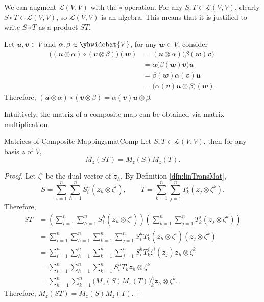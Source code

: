 \documentclass[math, code]{amznotes}
\theoremstyle{remark}
\begin{document}
We can augment $\mathcal{L}(V, V)$ with the $\circ$ operation. For any $S, T \in \mathcal{L}(V, V)$, clearly $S \circ T \in \mathcal{L}(V, V)$, so $\mathcal{L}(V, V)$ is an algebra. This means that it is justified to write $S \circ T$ as a product $ST$.

Let $\mathbfit{u}, \mathbfit{v} \in V$ and $\alpha, \beta \in \yhwidehat{V}$, for any $\mathbfit{w} \in V$, consider
\begin{align*}
    \bigl((\mathbfit{u} \otimes \alpha) \circ (\mathbfit{v} \otimes \beta)\bigr)(\mathbfit{w}) & = (\mathbfit{u} \otimes \alpha)\bigl(\beta(\mathbfit{w})\mathbfit{v}\bigr) \\
    & = \alpha\bigl(\beta(\mathbfit{w})\mathbfit{v}\bigr)\mathbfit{u} \\
    & = \beta(\mathbfit{w})\alpha(\mathbfit{v})\mathbfit{u} \\
    & = \bigl(\alpha(\mathbfit{v})\mathbfit{u} \otimes \beta\bigr)(\mathbfit{w}).
\end{align*}
Therefore, $(\mathbfit{u} \otimes \alpha) \circ (\mathbfit{v} \otimes \beta) = \alpha(\mathbfit{v})\mathbfit{u} \otimes \beta$.

Intuitively, the matrix of a composite map can be obtained via matrix multiplication.
\begin{probox}{Matrices of Composite Mappings}{matComp}
    Let $S, T \in \mathcal{L}(V, V)$, then for any basis $z$ of $V$, 
    \begin{equation*}
        M_z(ST) = M_z(S)M_z(T).
    \end{equation*}
    \tcblower
    \begin{proof}
        Let $\zeta^i$ be the dual vector of $\mathbfit{z}_h$. By Definition \ref{dfn:linTransMat}, 
        \begin{equation*}
            S = \sum_{i = 1}^{n}\sum_{h = 1}^{n}S^h_i(\mathbfit{z}_h \otimes \zeta^i), \qquad T = \sum_{k = 1}^{n}\sum_{j = 1}^{n}T^j_k(\mathbfit{z}_j \otimes \zeta^k).
        \end{equation*}
        Therefore,
        \begin{align*}
            ST & = \left(\sum_{i = 1}^{n}\sum_{h = 1}^{n}S^h_i(\mathbfit{z}_h \otimes \zeta^i)\right)\left(\sum_{k = 1}^{n}\sum_{j = 1}^{n}T^j_k(\mathbfit{z}_j \otimes \zeta^k)\right) \\
            & = \sum_{i = 1}^{n}\sum_{h = 1}^{n}\sum_{k = 1}^{n}\sum_{j = 1}^{n}S^h_iT^j_k(\mathbfit{z}_h \otimes \zeta^i)(\mathbfit{z}_j \otimes \zeta^k) \\
            & = \sum_{i = 1}^{n}\sum_{h = 1}^{n}\sum_{k = 1}^{n}\sum_{j = 1}^{n}S^h_iT^j_k\zeta^i(\mathbfit{z}_j)\mathbfit{z}_h \otimes \zeta^k \\
            & = \sum_{i = 1}^{n}\sum_{h = 1}^{n}\sum_{k = 1}^{n}S^h_iT^i_k\mathbfit{z}_h \otimes \zeta^k \\
            & = \sum_{h = 1}^{n}\sum_{k = 1}^{n}\bigl(M_z(S)M_z(T)\bigr)^h_k\mathbfit{z}_h \otimes \zeta^k.
        \end{align*}
        Therefore, $M_z(ST) = M_z(S)M_z(T)$.
    \end{proof}
\end{probox}
\end{document}
